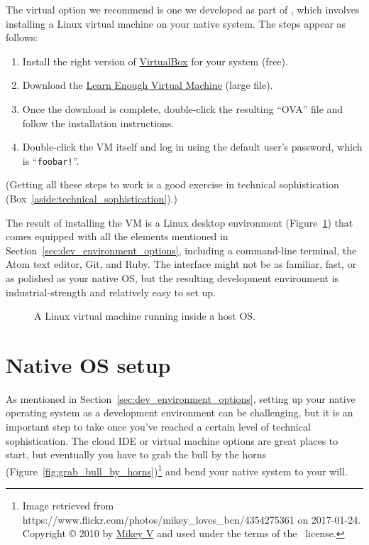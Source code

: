 The virtual option we recommend is one we developed as part of \lecl, which involves installing a Linux virtual machine on your native system. The steps appear as follows:
\begin{enumerate}
\item Install the right version of \href{https://www.virtualbox.org/}{VirtualBox} for your system (free).
\item Download the \href{https://softcover-static.s3.amazonaws.com/LearnEnough-v.1.4.ova}{Learn Enough Virtual Machine} (large file).
\item Once the download is complete, double-click the resulting ``OVA'' file and follow the installation instructions.
\item Double-click the VM itself and log in using the default user's password, which is ``\texttt{foobar!}''.
\end{enumerate}
(Getting all these steps to work is a good exercise in technical sophistication (Box~\ref{aside:technical_sophistication}).)

The result of installing the VM is a Linux desktop environment (Figure~\ref{fig:virtual_machine}) that comes equipped with all the elements mentioned in Section~\ref{sec:dev_environment_options}, including a command-line terminal, the Atom text editor, Git, and Ruby. The interface might not be as familiar, fast, or as polished as your native OS, but the resulting development environment is industrial-strength and relatively easy to set up.

\begin{figure}
\begin{center}
\end{center}
\caption{A Linux virtual machine running inside a host OS.\label{fig:virtual_machine}}
\end{figure}



\section{Native OS setup} %
\label{sec:native_os_setup}

As mentioned in Section~\ref{sec:dev_environment_options}, setting up your native operating system as a development environment can be challenging, but it is an important step to take once you've reached a certain level of technical sophistication. The cloud IDE or virtual machine options are great places to start, but eventually you have to grab the bull by the horns (Figure~\ref{fig:grab_bull_by_horns})\footnote{Image retrieved from https://www.flickr.com/photos/mikey\_loves\_bcn/4354275361 on 2017-01-24. Copyright © 2010 by \href{https://www.flickr.com/photos/mikey_loves_bcn/}{Mikey V} and used under the terms of the \ccbync\ license.} and bend your native system to your will.

